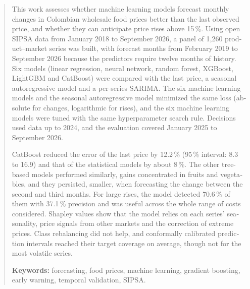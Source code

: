 \begin{otherlanguage}{english}
\renewcommand\abstractname{Abstract}
\begin{abstract}
\addchaptertocentry{\abstractname}
This work assesses whether machine learning models forecast monthly changes in Colombian wholesale food prices better than the last observed price, and whether they can anticipate price rises above 15\,\%. Using open SIPSA data from January 2018 to September 2026, a panel of 1,260 product--market series was built, with forecast months from February 2019 to September 2026 because the predictors require twelve months of history. Six models (linear regression, neural network, random forest, XGBoost, LightGBM and CatBoost) were compared with the last price, a seasonal autoregressive model and a per-series SARIMA. The six machine learning models and the seasonal autoregressive model minimized the same loss (absolute for changes, logarithmic for rises), and the six machine learning models were tuned with the same hyperparameter search rule. Decisions used data up to 2024, and the evaluation covered January 2025 to September 2026.

CatBoost reduced the error of the last price by 12.2\,\% (95\,\% interval: 8.3 to 16.9) and that of the statistical models by about 8\,\%. The other tree-based models performed similarly, gains concentrated in fruits and vegetables, and they persisted, smaller, when forecasting the change between the second and third months. For large rises, the model detected 70.6\,\% of them with 37.1\,\% precision and was useful across the whole range of costs considered. Shapley values show that the model relies on each series' seasonality, price signals from other markets and the correction of extreme prices. Class rebalancing did not help, and conformally calibrated prediction intervals reached their target coverage on average, though not for the most volatile series.

\medskip

\textbf{Keywords:} forecasting, food prices, machine learning, gradient boosting, early warning, temporal validation, SIPSA.
\end{abstract}
\end{otherlanguage}

